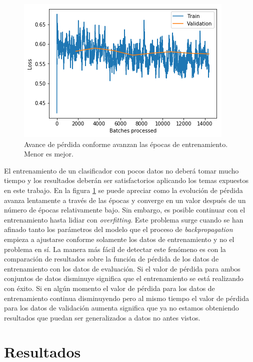\begin{figure}
\centering
\includegraphics[scale=1]{Figures/clas_epochs.png}
\caption{Avance de pérdida conforme avanzan las épocas de entrenamiento. Menor es mejor.}
\label{fig:clasepochs}
\end{figure}

El entrenamiento de un clasificador con pocos datos no deberá tomar mucho tiempo y los resultados deberán ser satisfactorios aplicando los temas expuestos en este trabajo. En la figura \ref{fig:clasepochs} se puede apreciar como la evolución de pérdida avanza lentamente a través de las épocas y converge en un valor después de un número de épocas relativamente bajo. Sin embargo, es posible continuar con el entrenamiento hasta lidiar con \textit{overfitting}. Este problema surge cuando se han afinado tanto los parámetros del modelo que el proceso de \textit{backpropagation} empieza a ajustarse conforme solamente los datos de entrenamiento y no el problema en sí. La manera más fácil de detectar este fenómeno es con la comparación de resultados sobre la función de pérdida de los datos de entrenamiento con los datos de evaluación. Si el valor de pérdida para ambos conjuntos de datos disminuye significa que el entrenamiento se está realizando con éxito. Si en algún momento el valor de pérdida para los datos de entrenamiento continua disminuyendo pero al mismo tiempo el valor de pérdida para los datos de validación aumenta significa que ya no estamos obteniendo resultados que puedan ser generalizados a datos no antes vistos.

\section{Resultados}

